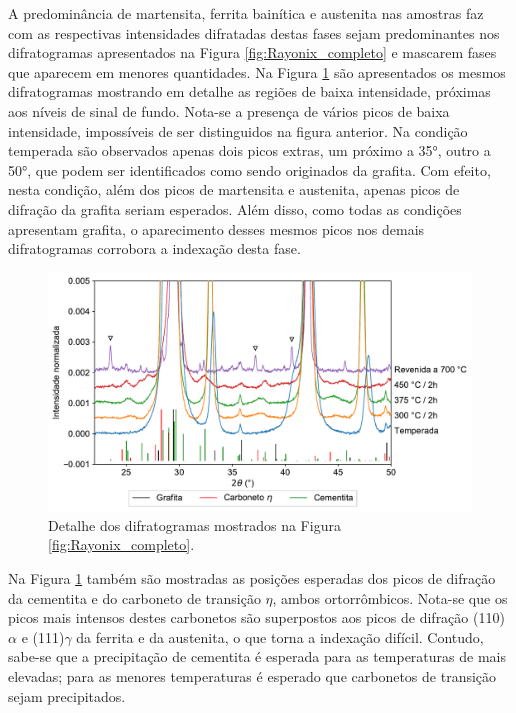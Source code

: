 A predominância de martensita, ferrita bainítica e austenita nas amostras faz com as respectivas intensidades difratadas destas fases sejam predominantes nos difratogramas apresentados na Figura \ref{fig:Rayonix_completo} e mascarem fases que aparecem em menores quantidades. Na Figura \ref{fig:Rayonix_detalhe} são apresentados os mesmos difratogramas mostrando em detalhe as regiões de baixa intensidade, próximas aos níveis de sinal de fundo. Nota-se a presença de vários picos de baixa intensidade, impossíveis de ser distinguidos na figura anterior. Na condição temperada são observados apenas dois picos extras, um próximo a 35°, outro a 50°, que podem ser identificados como sendo originados da grafita. Com efeito, nesta condição, além dos picos de martensita e austenita, apenas picos de difração da grafita seriam esperados. Além disso, como todas as condições apresentam grafita, o aparecimento desses mesmos picos nos demais difratogramas corrobora a indexação desta fase. 

\begin{figure}
  \centering
  \includegraphics[width=\textwidth]{img/XTMS/selected_diffractograms_detail.pdf}
  \caption{Detalhe dos difratogramas mostrados na Figura \ref{fig:Rayonix_completo}.}
  \label{fig:Rayonix_detalhe}
\end{figure}

Na Figura \ref{fig:Rayonix_detalhe} também são mostradas as posições esperadas dos picos de difração da cementita e do carboneto de transição $\eta$\cite{Oila2014}, ambos ortorrômbicos. Nota-se que os picos mais intensos destes carbonetos são superpostos aos picos de difração (110)$\alpha$ e (111)$\gamma$ da ferrita e da austenita, o que torna a indexação difícil. Contudo, sabe-se que a precipitação de cementita é esperada para as temperaturas de mais elevadas; para as menores temperaturas é esperado que carbonetos de transição sejam precipitados. 

